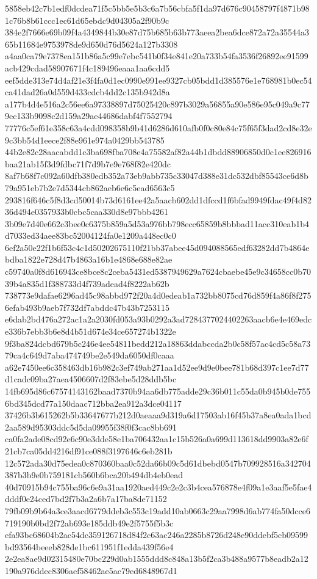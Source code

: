 \documentclass[11pt,a4paper]{article}
\begin{document}
{5858eb42c7b1edf0dcdea71f5c5bb5e5b3c6a7b56cbfa5f1da97d676c90458797f4871b981c76b8b61ccc1ec61d65ebdc9d04305a2f90b9c
384e2f7666e69b09f4a4349844b30e87d75b685b63b773aeea2bea6dce872a72a35544a365b11684e9753978de9d650d76d5624a127b3308
a4aa0ca79e7378ea151b86a5c99e7ebc541b0f34e841e20a733b54fa3536f26892ee91599acb429cdad58907671f4c189496eaaa1aa6cdd5
eef5dde313e74d4af21e3f4fa0d1ec0990e991ee9327cb05bdd1d385576e1e768981b0ec54ca41dad26a0d559d433cdcb4dd2c135b942d8a
a177b4d4e516a2c56ee6a97338897d75025420c897b3029a56855a90e586e95c049a9c779ec133b9098c2d159a29ae44686dabf4f7552794
77776c5ef61e358c63a4cdd098358b9b41d6286d610afb0f0c80e84c75f65f3dad2cd8e32e9c3bb54d1eece2f88e961e974a0429bb543785
44b2e82c28aacabdd1c3ba698fba708e4a75582af82a44b1dbdd88906850d0c1ee826916baa21ab15f3d9fdbc71f7d9b7e9e768f82e420dc
8af7b68f7c092a60dfb380edb352a73eb9abb735c33047d388e31dc532dbf85543ce6d8b79a951eb7b2e7d5344cb862aeb6e6c5ead6563c5
293816f646c5f8d3cd50014b73d6161ee42a5aacb602dd1dfccd1f6bfad9949fdac49f4d8236d494e0357933b0cbc5caa330d8e97bbb4261
3b09e7d40e662c3bee0c6375b859a5d53a976bb798ecc65859b8bbbad11acc310eab1b4d7033ed34aee83bc52004124fa0e1209a448ec0c0
6ef2a50e22f1b6f53c4c1d50202675110f21bb37abee45d094088565edf63282dd7b4864ebdba1822e728d47b4863a16b1e4868e688e82ae
c59740a0f8d616943ce8bce8c2ceba5431ed5387949629a7624cbaebe45e9c34658cc0b7039b4a835d1f388733d4f739adead4f8222ab62b
738773e9dafae6296ad45c98abbd972f20a4d0edeab1a732bb8075cd76d859f4a86f8f2756efab493b9aeb7f732df7abddc47b43b7253115
e6dab2bd476a272ac1a2a2030fd053a93b0292a3ad7284377024402263aacb6e4e469edce336b7ebb3b6e8d4b51d674e34ce657274b1322e
9f3ba824dcbd679b5c246e4ee54811bedd212a18863ddabccda2b0c58f57ac4cd5c58a7379ca4c649d7aba474749be2e549da6050df0caaa
a62e7450ee6c358463db16b982c3ef749ab271aa1d52ee9d9e0bee781b68d397c1ee7d77d1cadc09ba27aea4506607d2f83ebe5d28ddb5bc
14fb695d86c67574143162baad7370b94aa6db775adde29c36b011c55da0b945b0de7556bd345dcd77a150daac712bba2ea912a3dce04117
37426b3b615262b5b33647677b212d0aeaaa9d319a6d17503ab16f45b37a8ea0ada1bcd2aa589d95303ddc5d5da09955f38f0f3cac8bb691
ca0fa2ade08cd92e6c90e3dde58e1ba706432aa1c15b526a0a699d113618dd9903a82e6f21cb7ca05dd4216df91ce088f3197646c6eb281b
12c572ada30d75edea0c870360baa0c52da66b09c5d61dbebd0547b709928516a342704387b3b9e0b759181cb560b6bca20b494db4eb0ead
40d70915b94c755ba96c6e9a31aa1920aed449c2e2c3b4cea576878e4f09a1e3aaf5e5fae4dddf0e24ced7bd2f7b3a2a6b7a17ba8de71152
79fb09b9b64a3ce3aacd6779ddeb3c553c19add10ab0663c29aa7998d6ab774fa50dcce6719190b0bd2f72ab693e185ddb49e2f5755f5b3c
efa93bc68604b2ac54dc359126718d84f2c63ac246a2285b8726d248e90ddebf5cb09599bd93564beeeb828de1bc611951f1edda439f56e4
2e2ea8ae9d02315480e70bc229d0ab1555ddd8c848a13b5f2ca3b488a9577b8eadb2a12190a976ddec8306aef58462ae5ac79ed6848967d1
}
\end{document}
